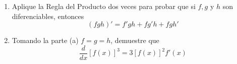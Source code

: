 \item 
\begin{enumerate}
    \item Aplique la Regla del Producto dos veces para probar que si $f, g$ y $h$ son diferenciables, entonces
    $$(fgh)' = f'gh + fg'h + fgh'$$
    \item Tomando la parte (a) $f = g = h$, demuestre que
    $$\frac{d}{dx} [f(x)]^3 = 3[f(x)]^2 f'(x)$$
\end{enumerate}
